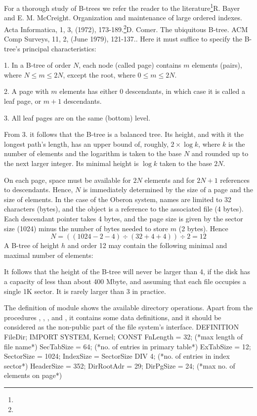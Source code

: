 For a thorough study of B-trees we refer the reader to the literature\footnote{{\mc[1]}}{R. Bayer and E. M. McCreight. Organization and maintenance of large ordered indexes. Acta Informatica, 1, 3, (1972), 173-189.}\footnote{{\mc[2]}}{D. Comer. The ubiquitous B-tree. ACM Comp Surveys, 11, 2, (June 1979), 121-137.}. Here it must suffice to specify the B-tree's principal characteristics:

\item{1.} In a B-tree of order $N$, each node (called page) contains $m$ elements (pairs), where $N \le m \le 2N$, except the root, where $0 \le m \le 2N$.
\item{2.} A page with $m$ elements has either 0 descendants, in which case it is called a leaf page, or $m + 1$ descendants.
\item{3.} All leaf pages are on the same (bottom) level.

From 3. it follows that the B-tree is a balanced tree. Its height, and with it the longest path's length, has an upper bound of, roughly, $2 \times \log{k}$, where $k$ is the number of elements and the logarithm is taken to the base $N$ and rounded up to the next larger integer. Its minimal height is $\log{k}$ taken to the base $2N$.

On each page, space must be available for $2N$ elements and for $2N + 1$ references to descendants. Hence, $N$ is immediately determined by the size of a page and the size of elements. In the case of the Oberon system, names are limited to 32 characters (bytes), and the object is a reference to the associated file (4 bytes). Each descendant pointer takes 4 bytes, and the page size is given by the sector size (1024) minus the number of bytes needed to store $m$ (2 bytes). Hence
$$N = ((1024 - 2 - 4) \div (32 + 4 + 4)) \div 2 = 12$$
\eject
A B-tree of height $h$ and order 12 may contain the following minimal and maximal number of elements:

\medskip{}\medskip

It follows that the height of the B-tree will never be larger than 4, if the disk has a capacity of less than about 400 Mbyte, and assuming that each file occupies a single 1K sector. It is rarely larger than 3 in practice.

The definition of module  shows the available directory operations. Apart from the procedures , , , and , it contains some data definitions, and it should be considered as the non-public part of the file system's interface.
\begintt
DEFINITION FileDir;
  IMPORT SYSTEM, Kernel;
  CONST
    FnLength = 32; (*max length of file name*)
    SecTabSize = 64; (*no. of entries in primary table*)
    ExTabSize = 12;
    SectorSize = 1024;
    IndexSize = SectorSize DIV 4; (*no. of entries in index sector*)
    HeaderSize = 352;
    DirRootAdr = 29;
    DirPgSize = 24; (*max no. of elements on page*)
    
